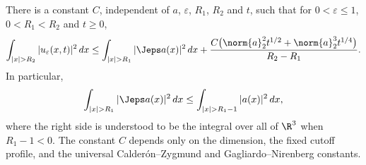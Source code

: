 \documentclass[11pt,reqno]{amsart}
\begin{document}
\begin{lemma}\label{lem:reg-tails}
There is a constant $C$, independent of $a$, $\varepsilon$, $R_1$, $R_2$ and
$t$, such that for $0<\varepsilon\leq1$, $0<R_1<R_2$ and $t\geq0$,
\begin{equation}\label{eq:reg-tails}
  \int_{|x|>R_2}|u_\varepsilon(x,t)|^2\,dx
  \leq \int_{|x|>R_1}|\Jeps a(x)|^2\,dx
    +\frac{C\bigl(\norm{a}_2^2t^{1/2}
                   +\norm{a}_2^3t^{1/4}\bigr)}{R_2-R_1}.
\end{equation}
In particular,
\[
  \int_{|x|>R_1}|\Jeps a(x)|^2\,dx
  \leq \int_{|x|>R_1-1}|a(x)|^2\,dx,
\]
where the right side is understood to be the integral over all of $\R^3$
when $R_1-1<0$. The constant $C$ depends only on the dimension, the fixed
cutoff profile, and the universal Calder\'on--Zygmund and
Gagliardo--Nirenberg constants.
\end{lemma}
\end{document}
